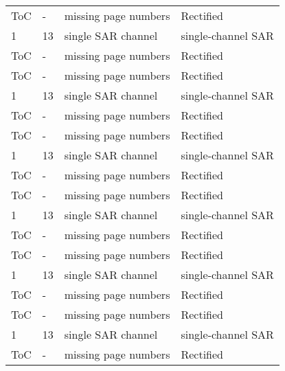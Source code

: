 \begin{longtable}[c]{p{}|p{}|p{}|p{}}
ToC & - & missing page numbers & Rectified \\
1 & 13 & single SAR channel & single-channel SAR \\ 
ToC & - & missing page numbers & Rectified \\
ToC & - & missing page numbers & Rectified \\
1 & 13 & single SAR channel & single-channel SAR \\ 
ToC & - & missing page numbers & Rectified \\
ToC & - & missing page numbers & Rectified \\
1 & 13 & single SAR channel & single-channel SAR \\ 
ToC & - & missing page numbers & Rectified \\
ToC & - & missing page numbers & Rectified \\
1 & 13 & single SAR channel & single-channel SAR \\ 
ToC & - & missing page numbers & Rectified \\
ToC & - & missing page numbers & Rectified \\
1 & 13 & single SAR channel & single-channel SAR \\ 
ToC & - & missing page numbers & Rectified \\
ToC & - & missing page numbers & Rectified \\
1 & 13 & single SAR channel & single-channel SAR \\ 
ToC & - & missing page numbers & Rectified \\
\end{longtable}    

